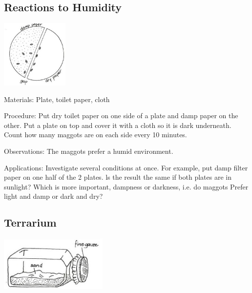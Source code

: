 \begin{multicols}{2}
\subsection{Reactions to Humidity}

\begin{center}
\includegraphics[width=0.25\textwidth]{./img/vso/reactions-humidity.jpg}
\end{center}

\begin{description*}
\item[Materials:]{Plate, toilet paper, cloth}
\item[Procedure:]{Put dry toilet paper on one side of
a plate and damp paper on the
other. Put a plate on top and
cover it with a cloth so it is dark
underneath. Count how many
maggots are on each side every
10 minutes.}
\item[Observations:]{The maggots prefer a humid environment.}
\item[Applications:]{Investigate several conditions at
once. For example, put damp
filter paper on one half of the 2
plates. ls the result the same if
both plates are in sunlight? Which
is more important, dampness or
darkness, i.e. do maggots Prefer
light and damp or dark and dry?}
\end{description*}

\subsection{Terrarium} %

\begin{center}
\includegraphics[width=0.4\textwidth]{./img/vso/terrarium.jpg}
\end{center}


\end{multicols}
